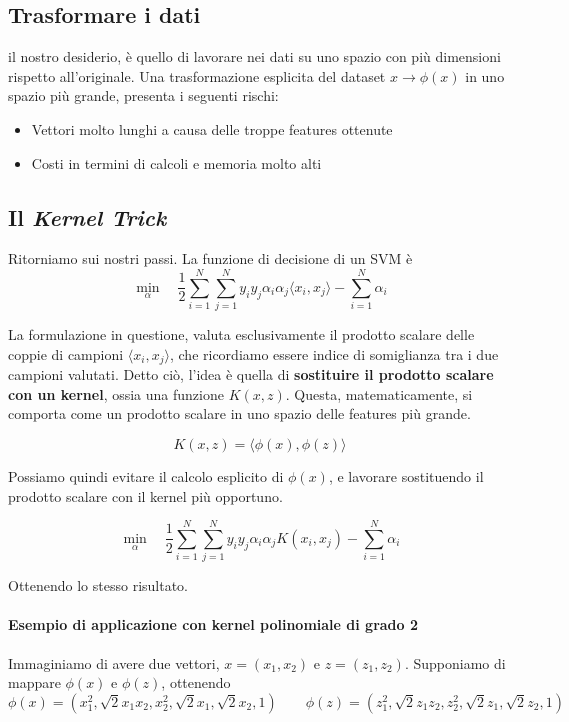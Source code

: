 \subsection{Trasformare i dati}
il nostro desiderio, è quello di lavorare nei dati su uno spazio con più dimensioni rispetto all'originale. Una trasformazione esplicita del dataset $x \to \phi(x)$ in uno spazio più grande, presenta i seguenti rischi:

\begin{itemize}
	\item Vettori molto lunghi a causa delle troppe features ottenute
	\item Costi in termini di calcoli e memoria molto alti
\end{itemize}

\subsection{Il \textit{Kernel Trick}}
Ritorniamo sui nostri passi. La funzione di decisione di un SVM è
$$
\min_{\alpha} \quad
\frac{1}{2} \sum_{i=1}^{N} \sum_{j=1}^{N}
y_i y_j \alpha_i \alpha_j \langle x_i, x_j \rangle
- \sum_{i=1}^{N} \alpha_i 
$$

La formulazione in questione, valuta esclusivamente il prodotto scalare delle coppie di campioni $\langle x_i, x_j\rangle$, che ricordiamo essere indice di somiglianza tra i due campioni valutati. Detto ciò, l'idea è quella di \textbf{sostituire il prodotto scalare con un kernel}, ossia una funzione $K(x, z)$. Questa, matematicamente, si comporta come un prodotto scalare in uno spazio delle features più grande.

$$K(x,z) = \langle \phi(x), \phi(z)\rangle$$

Possiamo quindi evitare il calcolo esplicito di $\phi(x)$, e lavorare sostituendo il prodotto scalare con il kernel più opportuno.

$$
\min_{\alpha} \quad
\frac{1}{2} \sum_{i=1}^{N} \sum_{j=1}^{N}
y_i y_j \alpha_i \alpha_j K(x_i,x_j)
- \sum_{i=1}^{N} \alpha_i 
$$

Ottenendo lo stesso risultato. 

\paragraph{Esempio di applicazione con kernel polinomiale di grado 2}

Immaginiamo di avere due vettori, $x = (x_1, x_2)$ e $z = (z_1, z_2)$.
Supponiamo di mappare $\phi(x)$ e $\phi(z)$, ottenendo
$$\phi(x) =
(
x_1^2,
\sqrt{2}x_1 x_2,
x_2^2,
\sqrt{2}x_1,
\sqrt{2}x_2,
1
) \qquad \phi(z) =
(
z_1^2,
\sqrt{2}z_1 z_2,
z_2^2,
\sqrt{2}z_1,
\sqrt{2}z_2,
1
)$$

